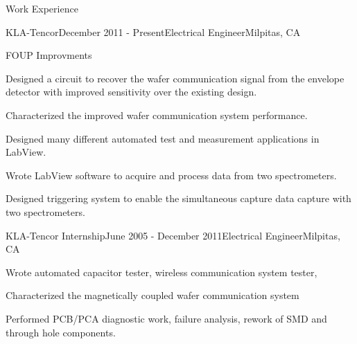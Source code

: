 \documentclass{resume} %
\begin{document}
\begin{rSection}{Work Experience}
\begin{rSubsection}{KLA-Tencor}{December 2011 - Present}{Electrical Engineer}{Milpitas, CA}
\begin{rWorkProject}{FOUP Improvments}
\item Designed a circuit to recover the wafer communication signal from the envelope detector with improved sensitivity over the existing design.
\item Characterized the improved wafer communication system performance.
\end{rWorkProject}

\smallskip
\item Designed many different automated test and measurement applications in LabView.
\item Wrote LabView software to acquire and process data from two spectrometers.
\item Designed triggering system to enable the simultaneous capture data capture with two spectrometers.
\end{rSubsection}


\begin{rSubsection}{KLA-Tencor Internship}{June 2005 - December 2011}{Electrical Engineer}{Milpitas, CA}
\item Wrote automated capacitor tester, wireless communication system tester, 
\item Characterized the magnetically coupled wafer communication system
\item Performed PCB/PCA diagnostic work, failure analysis, rework of SMD and through hole components.
\end{rSubsection}

\end{rSection}

\end{document}
